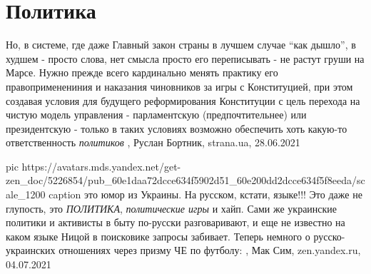  
 
 
 
 
\chapter{Политика}
\label{sec:slova.politika}

Но, в системе, где даже Главный закон страны в лучшем случае \enquote{как дышло}, в
худшем - просто слова, нет смысла просто его переписывать - не растут груши на
Марсе. Нужно прежде всего кардинально менять практику его правоприменениния и
наказания чиновников за игры с Конституцией, при этом создавая условия для
будущего реформирования Конституции с цель перехода на чистую модель управления
- парламентскую (предпочтительнее) или президентскую - только в таких условиях
возможно обеспечить хоть какую-то ответственность \emph{политиков}
, 
Руслан Бортник, strana.ua, 28.06.2021

\ifcmt
  pic https://avatars.mds.yandex.net/get-zen_doc/5226854/pub_60e1daa72dcce634f5902d51_60e200dd2dcce634f5f8eeda/scale_1200
  caption это юмор из Украины. На русском, кстати, языке!!!
\fi
Это даже не глупость, это \emph{ПОЛИТИКА}, \emph{политические игры} и хайп.
Сами же украинские политики и активисты в быту по-русски разговаривают, и еще
не известно на каком языке Ницой в поисковике запросы забивает.
Теперь немного о русско-украинских отношениях через призму ЧЕ по футболу:
, Мак Сим,
zen.yandex.ru, 04.07.2021

